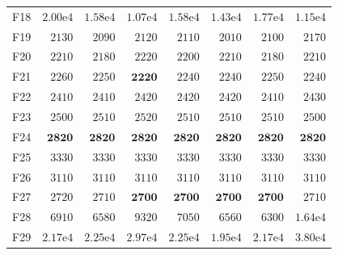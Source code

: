 \begin{tabular}{lrrrrrrr}
F18 & $2.00\mathrm{e}{4}$ & $1.58\mathrm{e}{4}$ & $1.07\mathrm{e}{4}$ & $1.58\mathrm{e}{4}$ & $1.43\mathrm{e}{4}$ & $1.77\mathrm{e}{4}$ & $1.15\mathrm{e}{4}$ \\
F19 & $2130$ & $2090$ & $2120$ & $2110$ & $2010$ & $2100$ & $2170$ \\
F20 & $2210$ & $2180$ & $2220$ & $2200$ & $2210$ & $2180$ & $2210$ \\
F21 & $2260$ & $2250$ & $\mathbf{2220}$ & $2240$ & $2240$ & $2250$ & $2240$ \\
F22 & $2410$ & $2410$ & $2420$ & $2420$ & $2420$ & $2410$ & $2430$ \\
F23 & $2500$ & $2510$ & $2520$ & $2510$ & $2510$ & $2510$ & $2500$ \\
F24 & $\mathbf{2820}$ & $\mathbf{2820}$ & $\mathbf{2820}$ & $\mathbf{2820}$ & $\mathbf{2820}$ & $\mathbf{2820}$ & $\mathbf{2820}$ \\
F25 & $3330$ & $3330$ & $3330$ & $3330$ & $3330$ & $3330$ & $3330$ \\
F26 & $3110$ & $3110$ & $3110$ & $3110$ & $3110$ & $3110$ & $3110$ \\
F27 & $2720$ & $2710$ & $\mathbf{2700}$ & $\mathbf{2700}$ & $\mathbf{2700}$ & $\mathbf{2700}$ & $2710$ \\
F28 & $6910$ & $6580$ & $9320$ & $7050$ & $6560$ & $6300$ & $1.64\mathrm{e}{4}$ \\
F29 & $2.17\mathrm{e}{4}$ & $2.25\mathrm{e}{4}$ & $2.97\mathrm{e}{4}$ & $2.25\mathrm{e}{4}$ & $1.95\mathrm{e}{4}$ & $2.17\mathrm{e}{4}$ & $3.80\mathrm{e}{4}$ \\
\bottomrule
\end{tabular}
